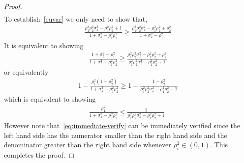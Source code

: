 \documentclass[journal, twocolumn, 10pt]{IEEEtran}
\begin{document}
{\begin{proof}
\begin{align}
\end{align} 
To establish~\eqref{eqvar} we only need to show that, 
\begin{align}
\frac{\rho_{1}^2\rho_{2}^2\sigma^{2}_{z}-\rho_{1}^{2}\rho_{2}^2+1}{1+\sigma^{2}_{z}-\rho^{2}_{1}\rho^{2}_{2}}  \ge  \frac{\rho_{1}^2\rho_{2}^2\sigma^{2}_{z}-\rho_{1}^2\rho_{2}^2+\rho_{2}^2}{1+\sigma^{2}_{z}-\rho^{2}_{1}} \label{eqlem33}
\end{align} It is equivalent to showing 
\begin{align}
\frac{1+\sigma^{2}_{z}-\rho^{2}_{1}}{1+\sigma^{2}_{z}-\rho^{2}_{1}\rho^{2}_{2}} \ge  \frac{\rho_{1}^2\rho_{2}^2\sigma^{2}_{z}-\rho_{1}^2\rho_{2}^2+\rho_{2}^2}{\rho_{1}^2\rho_{2}^2\sigma^{2}_{z}-\rho_{1}^{2}\rho_{2}^2+1}   \label{eqlem44}
\end{align} or equivalently
\begin{align}
1- \frac{\rho^2_{1}(1-\rho^2_{2})}{1+\sigma^{2}_{z}-\rho^{2}_{1}\rho^{2}_{2}} \ge 
1- \frac{1-\rho^2_{2}}{\rho_{1}^2\rho_{2}^2\sigma^{2}_{z}-\rho_{1}^{2}\rho_{2}^2+1}  
\end{align} which is equivalent to showing
\begin{align}
\frac{\rho^2_{1}}{1+\sigma^{2}_{z}-\rho^{2}_{1}\rho^{2}_{2}} \le
\frac{1}{\rho_{1}^2\rho_{2}^2\sigma^{2}_{z}-\rho_{1}^{2}\rho_{2}^2+1}. \label{eq:immediate-verify}
\end{align}
However note that~\eqref{eq:immediate-verify} can be immediately verified since the left hand side
has the numerator smaller than the right hand side and the denominator greater than the right hand side whenever
$\rho_i^2 \in (0,1)$.
This completes the proof.
\end{proof}

}
\end{document}
